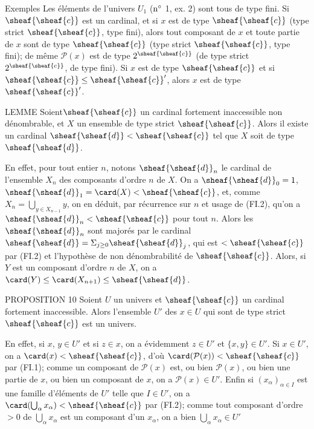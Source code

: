 \begin{enonce*}[remark]{Exemples}
Les éléments de l'univers $U_1$ (${\rm n^{\circ}}$ 1, ex. 2) sont
tous de type fini. Si $\sheaf{\sheaf{c}}$ est un cardinal, et si $x$
est de type $\sheaf{\sheaf{c}}$ (\resp type strict
$\sheaf{\sheaf{c}}$, type fini), alors tout composant de $x$ et
toute partie de $x$ sont de type $\sheaf{\sheaf{c}}$ (\resp type
strict $\sheaf{\sheaf{c}}$, type fini); de même $\mathcal{P}(x)$ est
de type $2^{\sheaf{\sheaf{c}}}$ (\resp de type strict
$2^{\sheaf{\sheaf{c}}}$, de type fini). Si $x$ est de type
$\sheaf{\sheaf{c}}$ et si $\sheaf{\sheaf{c}}\leq
\sheaf{\sheaf{c}}'$, alors $x$ est de type $\sheaf{\sheaf{c}}'$.
\end{enonce*}

\begin{enonce*}{LEMME}
Soient\pageoriginale $\sheaf{\sheaf{c}}$ un cardinal fortement
inaccessible non dénombrable, et $X$ un ensemble de type strict
$\sheaf{\sheaf{c}}$. Alors il existe un cardinal
$\sheaf{\sheaf{d}}<\sheaf{\sheaf{c}}$ tel que $X$ soit de type
$\sheaf{\sheaf{d}}$.
\end{enonce*}

En effet, pour tout entier $n$, notons $\sheaf{\sheaf{d}}_n$ le
cardinal de l'ensemble $X_n$ des composants d'ordre $n$ de $X$. On a
$\sheaf{\sheaf{d}}_0=1$,
$\sheaf{\sheaf{d}}_1=\card(X)<\sheaf{\sheaf{c}}$, et, comme
$X_n=\bigcup_{y\in X_{n-1}} y$, on en déduit, par récurrence sur $n$
et usage de (FI.2), qu'on a $\sheaf{\sheaf{d}}_n<\sheaf{\sheaf{c}}$
pour tout $n$. Alors les $\sheaf{\sheaf{d}}_n$ sont majorés par le
cardinal $\sheaf{\sheaf{d}}=\Sigma_{j\geq 0}\sheaf{\sheaf{d}}_j$,
qui est $<\sheaf{\sheaf{c}}$ par (FI.2) et l'hypothèse de non
dénombrabilité de $\sheaf{\sheaf{c}}$. Alors, si $Y$ est un
composant d'ordre $n$ de $X$, on a $\card(Y)\leq \card(X_{n+1})\leq
\sheaf{\sheaf{d}}$. \cqfd

\begin{enonce*}{PROPOSITION 10}
Soient $U$ un univers et $\sheaf{\sheaf{c}}$ un cardinal fortement
inaccessible. Alors l'ensemble $U'$ des $x\in U$ qui sont de type
strict $\sheaf{\sheaf{c}}$ est un univers.
\end{enonce*}
En effet, si $x$, $y\in U'$ et si $z\in x$, on a évidemment $z\in
U'$ et $\{x,y\}\in U'$. Si $x\in U'$, on a
$\card(x)<\sheaf{\sheaf{c}}$, d'où
$\card(\mathcal{P}(x))<\sheaf{\sheaf{c}}$ par (FI.1); comme un
composant de $\mathcal{P}(x)$ est, ou bien $\mathcal{P}(x)$, ou bien
une partie de $x$, ou bien un composant de $x$, on a
$\mathcal{P}(x)\in U'$. Enfin si $(x_{\alpha})_{\alpha\in I}$ est
une famille d'éléments de $U'$ telle que $I\in U'$, on a
$\card(\bigcup_{\alpha}x_{\alpha})<\sheaf{\sheaf{c}}$ par (FI.2);
comme tout composant d'ordre $>0$ de $\bigcup_{\alpha}x_{\alpha}$
est un composant d'un $x_{\alpha}$, on a bien
$\bigcup_{\alpha}x_{\alpha}\in U'$ \cqfd

